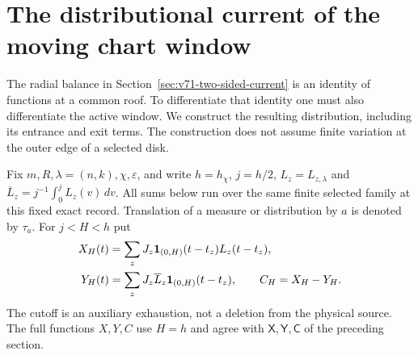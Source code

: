 \section{The distributional current of the moving chart window}
\label{sec:v72-window-current}
The radial balance in Section~\ref{sec:v71-two-sided-current} is
an identity of functions at a common roof. To differentiate that
identity one must also differentiate the active window. We construct
the resulting distribution, including its entrance and exit terms.
The construction does not assume finite variation at the outer edge
of a selected disk.

Fix $m,R,\lambda=(n,k),\chi,\varepsilon$, and write $h=h_\chi$,
$j=h/2$, $L_z=L_{z,\lambda}$ and
$\overline L_z=j^{-1}\int_0^jL_z(v)\,dv$. All sums below run over
the same finite selected family at this fixed exact record. Translation
of a measure or distribution by $a$ is denoted by $\tau_a$.
For $j<H<h$ put
\begin{equation}\label{eq:v72-truncated-capacities}
 \begin{split}
 X_H(t)&=\sum_zJ_z\one_{(0,H)}(t-t_z)L_z(t-t_z),\\
 Y_H(t)&=\sum_zJ_z\overline L_z\one_{(0,H)}(t-t_z),
 \qquad C_H=X_H-Y_H.
 \end{split}
\end{equation}
The cutoff is an auxiliary exhaustion, not a deletion from the
physical source. The full functions $X,Y,C$ use $H=h$ and agree
with $\mathsf X,\mathsf Y,\mathsf C$ of the preceding section.

